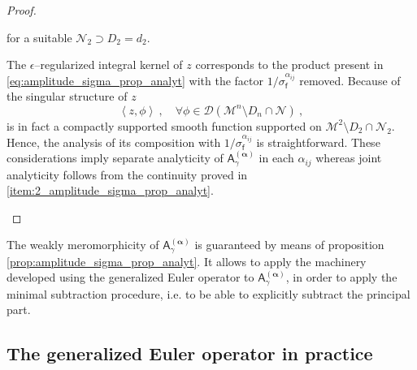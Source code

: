 \documentclass[11pt]{book}
\newcommand{\alphabd}{\boldsymbol{\alpha}}
\newcommand{\sm}[1]{\left\langle#1\right\rangle}
\newcommand{\Dcal}{\mathcal{D}}
\newcommand{\Mcal}{\mathcal{M}}
\newcommand{\Ncal}{\mathcal{N}}
\newcommand{\Asf}{\mathsf{A}}
\newcommand{\fsf}{\mathsf{f}}
\theoremstyle{break}
\begin{document}
\begin{proof}
\begin{description}
\begin{equation*}
\end{equation*}
%
for a suitable $\Ncal_2\supset D_2=d_2$. \par
%
The $\epsilon$--regularized integral kernel of $z$ corresponds to the product present in \eqref{eq:amplitude_sigma_prop_analyt} with the factor  $1/\sigma_\fsf^{\alpha_{ij}}$ removed. Because of the singular structure of $z$ 
%
\begin{equation*}
\sm{z,\phi} \ , \quad \forall \phi \in \Dcal\left(\Mcal^{n}\setminus D_{n}\cap \Ncal\right) \ ,  
\end{equation*}
%
is in fact a compactly supported smooth function supported on $\Mcal^{2}\setminus D_2\cap \Ncal_2$. Hence, the analysis of its composition with $1/\sigma_\fsf^{\alpha_{ij}}$ is straightforward. These considerations imply separate analyticity of $\Asf_\gamma^{(\alphabd)}$ in each $\alpha_{ij}$ whereas joint analyticity follows from the continuity proved in \ref{item:2_amplitude_sigma_prop_analyt}.
% 
\end{description}
\end{proof}



The weakly meromorphicity of $\Asf_\gamma^{(\alphabd)}$ is guaranteed by means of proposition \ref{prop:amplitude_sigma_prop_analyt}. It allows to apply the machinery developed using the generalized Euler operator to $\Asf_\gamma^{(\alphabd)}$, in order to apply the minimal subtraction procedure, i.e. to be able to explicitly subtract the principal part.



\subsection{The generalized Euler operator in practice}
\label{p:EULER_OP_PRACTICE}
\end{document}
